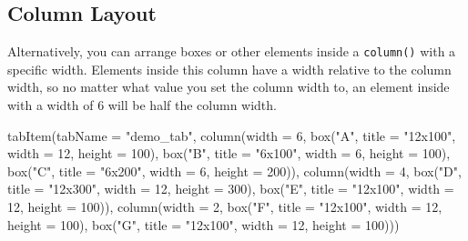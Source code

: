 \documentclass[
  oneside]{book}
\newenvironment{Shaded}{\begin{snugshade}}{\end{snugshade}}
\newcommand{\AttributeTok}[1]{\textcolor[rgb]{0.77,0.63,0.00}{#1}}
\newcommand{\DecValTok}[1]{\textcolor[rgb]{0.00,0.00,0.81}{#1}}
\newcommand{\FunctionTok}[1]{\textcolor[rgb]{0.00,0.00,0.00}{#1}}
\newcommand{\NormalTok}[1]{#1}
\newcommand{\StringTok}[1]{\textcolor[rgb]{0.31,0.60,0.02}{#1}}
\begin{document}
\hypertarget{column-layout}{%
\subsection{Column Layout}\label{column-layout}}

Alternatively, you can arrange boxes or other elements inside a \texttt{column}\texttt{()} with a specific \AttributeTok{width}. Elements inside this column have a width relative to the column width, so no matter what value you set the column \AttributeTok{width} to, an element inside with a \AttributeTok{width} of \DecValTok{6} will be half the column width.

\begin{Shaded}
\begin{Highlighting}[]
\FunctionTok{tabItem}\NormalTok{(}\AttributeTok{tabName =} \StringTok{"demo\_tab"}\NormalTok{, }\FunctionTok{column}\NormalTok{(}\AttributeTok{width =} \DecValTok{6}\NormalTok{, }\FunctionTok{box}\NormalTok{(}\StringTok{"A"}\NormalTok{, }\AttributeTok{title =} \StringTok{"12x100"}\NormalTok{, }\AttributeTok{width =} \DecValTok{12}\NormalTok{,}
    \AttributeTok{height =} \DecValTok{100}\NormalTok{), }\FunctionTok{box}\NormalTok{(}\StringTok{"B"}\NormalTok{, }\AttributeTok{title =} \StringTok{"6x100"}\NormalTok{, }\AttributeTok{width =} \DecValTok{6}\NormalTok{, }\AttributeTok{height =} \DecValTok{100}\NormalTok{), }\FunctionTok{box}\NormalTok{(}\StringTok{"C"}\NormalTok{, }\AttributeTok{title =} \StringTok{"6x200"}\NormalTok{,}
    \AttributeTok{width =} \DecValTok{6}\NormalTok{, }\AttributeTok{height =} \DecValTok{200}\NormalTok{)), }\FunctionTok{column}\NormalTok{(}\AttributeTok{width =} \DecValTok{4}\NormalTok{, }\FunctionTok{box}\NormalTok{(}\StringTok{"D"}\NormalTok{, }\AttributeTok{title =} \StringTok{"12x300"}\NormalTok{, }\AttributeTok{width =} \DecValTok{12}\NormalTok{,}
    \AttributeTok{height =} \DecValTok{300}\NormalTok{), }\FunctionTok{box}\NormalTok{(}\StringTok{"E"}\NormalTok{, }\AttributeTok{title =} \StringTok{"12x100"}\NormalTok{, }\AttributeTok{width =} \DecValTok{12}\NormalTok{, }\AttributeTok{height =} \DecValTok{100}\NormalTok{)), }\FunctionTok{column}\NormalTok{(}\AttributeTok{width =} \DecValTok{2}\NormalTok{,}
    \FunctionTok{box}\NormalTok{(}\StringTok{"F"}\NormalTok{, }\AttributeTok{title =} \StringTok{"12x100"}\NormalTok{, }\AttributeTok{width =} \DecValTok{12}\NormalTok{, }\AttributeTok{height =} \DecValTok{100}\NormalTok{), }\FunctionTok{box}\NormalTok{(}\StringTok{"G"}\NormalTok{, }\AttributeTok{title =} \StringTok{"12x100"}\NormalTok{,}
        \AttributeTok{width =} \DecValTok{12}\NormalTok{, }\AttributeTok{height =} \DecValTok{100}\NormalTok{)))}
\end{Highlighting}
\end{Shaded}
\end{document}
